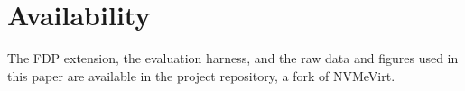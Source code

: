 \documentclass[letterpaper,twocolumn,10pt]{article}
\begin{document}
\section*{Availability}
The FDP extension, the evaluation harness, and the raw data and figures used in
this paper are available in the project repository, a fork of NVMeVirt.



\end{document}

